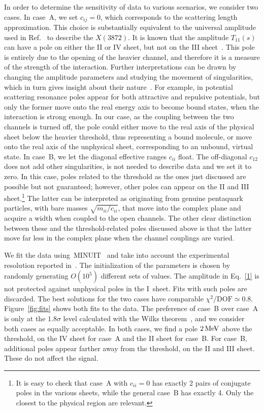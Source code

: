 \documentclass[aps,prl,
twocolumn,nofootinbib,
superscriptaddress,preprintnumbers]{revtex4-1}
\begin{document}
In order to determine the sensitivity of data to various scenarios, we consider two cases.
In case~A, we set $c_{ij}=0$, which corresponds to the scattering length approximation. This choice is substantially equivalent to the universal amplitude used in Ref.~\cite{Braaten:2007dw} to describe the $X(3872)$. It is known that the amplitude $T_{11}(s)$ 
 can have a pole on either the II or IV sheet, but not on the III sheet~\cite{Frazer:1964zz}. 
  This pole is entirely due to the opening 
    of the heavier channel, and therefore it
    is a measure of the strength of the \SigmaD interaction. 
Further interpretations can be drawn by changing the amplitude parameters and studying
  the movement of singularities, which in turn gives insight about their nature~\cite{Hanhart:2014ssa,Pelaez:2015qba}. For example, in potential scattering resonance poles appear for both attractive and repulsive potentials, but only the former move onto the real energy axis to  become bound states, when the interaction is strong enough.
In our case,   as the coupling between the two channels is turned off,  the pole could either move to the real axis of the physical sheet below the heavier threshold, thus representing a bound molecule, 
 or move onto the real axis of the unphysical sheet, corresponding to an unbound, virtual state.
  In case~B, we let the diagonal effective ranges $c_{ii}$ float. 
  The off-diagonal $c_{12}$ does not add other singularities, is not needed to describe data 
  and we set it
   to zero. In this case, poles related to the threshold as the ones just discussed are possible but not guaranteed; however, other poles can appear on the II and III sheet.\footnote{It is easy to check that case~A with $c_{ii} = 0$ has exactly 2 pairs of conjugate poles in the various sheets, while the general case~B has exactly 4. Only the closest to the physical region are relevant.} 
   The latter can be interpreted as originating from genuine pentaquark particles, with bare masses $\sqrt{m_{ii}/c_{ii}}$, that move into the complex plane and acquire a width when coupled to the open channels. The other clear distinction between these and the threshold-related poles discussed above is that the latter move far less in the complex plane when the channel couplings are varied.
  
We fit the data using~\textsc{MINUIT}~\cite{minuit}
and take into account the experimental resolution reported in~\cite{Aaij:2019vzc}.
The initialization of the parameters is chosen by randomly generating $O(10^5)$ different sets of values. The amplitude in Eq.~\eqref{1} is not protected against unphysical poles in the  I~sheet. Fits with such poles are discarded.
The best solutions for the two cases have comparable $\chi^2/\text{DOF}\simeq 0.8$. 
Figure~\ref{fig:fits} shows both fits to the data.
The preference of case~B over case~A is only at the $1.8\sigma$ level calculated with the Wilks theorem~\cite{Wilks:1938dza},
and we consider both cases as equally acceptable. 
In both cases, we find a pole $2{\mathrm{\,Me\kern -0.1em V}}$ above the \SigmaD threshold, on the IV sheet for case~A and the II sheet for case~B. 
For case~B, additional poles appear 
  farther away from the \SigmaD threshold, on the II and III sheet. These do not affect the \Pc signal.
\end{document}
